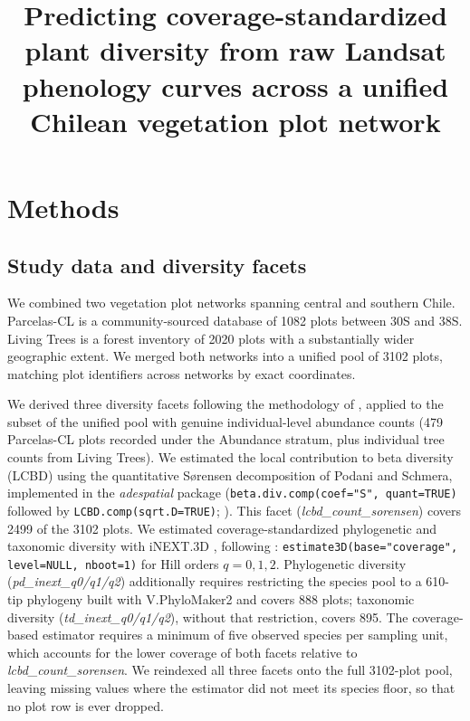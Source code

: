\documentclass[11pt]{article}
\title{Predicting coverage-standardized plant diversity from raw Landsat phenology
curves across a unified Chilean vegetation plot network}
\author{}
\date{}
\begin{document}
\maketitle

\section{Methods}

\subsection{Study data and diversity facets}

We combined two vegetation plot networks spanning central and southern Chile.
Parcelas-CL \citep{cerdaparedes2026parcelascl} is a community-sourced database of 1082
plots between 30\textdegree{}S and 38\textdegree{}S. Living Trees is a forest inventory
of 2020 plots with a substantially wider geographic extent. We merged both networks into
a unified pool of 3102 plots, matching plot identifiers across networks by exact
coordinates.

We derived three diversity facets following the methodology of
\citet{perezgiraldo2026environmental}, applied to the subset of the unified pool with
genuine individual-level abundance counts (479 Parcelas-CL plots recorded under the
Abundance stratum, plus individual tree counts from Living Trees). We estimated the
local contribution to beta diversity (LCBD) using the quantitative Sørensen
decomposition of Podani and Schmera, implemented in the \emph{adespatial} package
(\texttt{beta.div.comp(coef="S", quant=TRUE)} followed by
\texttt{LCBD.comp(sqrt.D=TRUE)}; \citealp{legendre2013beta}). This facet
(\emph{lcbd\_count\_sorensen}) covers 2499 of the 3102 plots. We estimated
coverage-standardized phylogenetic and taxonomic diversity with iNEXT.3D
\citep{chao2021measuring}, following \citet{perezgiraldo2026environmental}:
\texttt{estimate3D(base="coverage", level=NULL, nboot=1)} for Hill orders $q=0,1,2$.
Phylogenetic diversity (\emph{pd\_inext\_q0/q1/q2}) additionally requires restricting
the species pool to a 610-tip phylogeny built with V.PhyloMaker2
\citep{jinqian2022vphylomaker2} and covers 888 plots; taxonomic diversity
(\emph{td\_inext\_q0/q1/q2}), without that restriction, covers 895. The
coverage-based estimator requires a minimum of five observed species per sampling unit,
which accounts for the lower coverage of both facets relative to
\emph{lcbd\_count\_sorensen}. We reindexed all three facets onto the full 3102-plot pool,
leaving missing values where the estimator did not meet its species floor, so that no
plot row is ever dropped.
\end{document}
